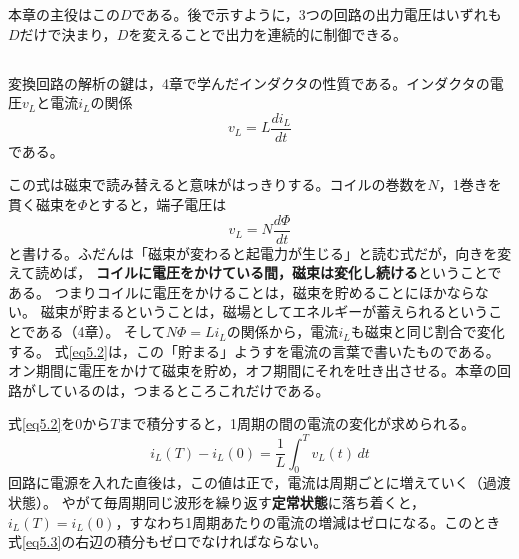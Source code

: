 本章の主役はこの$D$である。後で示すように，3つの回路の出力電圧はいずれも$D$だけで決まり，$D$を変えることで出力を連続的に制御できる。

\subsection{}

変換回路の解析の鍵は，4章で学んだインダクタの性質である。インダクタの電圧$v_L$と電流$i_L$の関係
\begin{equation}
v_L = L \frac{d i_L}{d t}
\label{eq5.2}
\end{equation}
である。

この式は磁束で読み替えると意味がはっきりする。コイルの巻数を$N$，1巻きを貫く磁束を$\Phi$とすると，端子電圧は
\begin{equation*}
v_L = N \frac{d \Phi}{d t}
\end{equation*}
と書ける。ふだんは「磁束が変わると起電力が生じる」と読む式だが，向きを変えて読めば，
\textbf{コイルに電圧をかけている間，磁束は変化し続ける}ということである。
つまりコイルに電圧をかけることは，磁束を貯めることにほかならない。
磁束が貯まるということは，磁場としてエネルギーが蓄えられるということである（4章）。
そして$N\Phi = L i_L$の関係から，電流$i_L$も磁束と同じ割合で変化する。
式\ref{eq5.2}は，この「貯まる」ようすを電流の言葉で書いたものである。
オン期間に電圧をかけて磁束を貯め，オフ期間にそれを吐き出させる。本章の回路がしているのは，つまるところこれだけである。

式\ref{eq5.2}を$0$から$T$まで積分すると，1周期の間の電流の変化が求められる。
\begin{equation}
i_L(T) - i_L(0) = \frac{1}{L} \int_0^T v_L(t)\, dt
\label{eq5.3}
\end{equation}
回路に電源を入れた直後は，この値は正で，電流は周期ごとに増えていく（過渡状態）。
やがて毎周期同じ波形を繰り返す\textbf{定常状態}に落ち着くと，
$i_L(T) = i_L(0)$，すなわち1周期あたりの電流の増減はゼロになる。このとき式\ref{eq5.3}の右辺の積分もゼロでなければならない。

